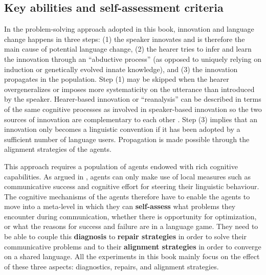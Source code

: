 \subsection{Key abilities and self-assessment criteria}

In the problem-solving approach adopted in this book, innovation and language change happens in three steps: (1) the speaker innovates and is therefore the main cause of potential language change, (2) the hearer tries to infer and learn the innovation through an ``abductive process'' (as opposed to uniquely relying on induction or genetically evolved innate knowledge), and (3) the innovation propagates in the population. Step (1) may be skipped when the hearer overgeneralizes or imposes more systematicity on the utterance than introduced by the speaker. Hearer-based innovation or ``reanalysis'' can be described in terms of the same cognitive processes as involved in speaker-based innovation so the two sources of innovation are complementary to each other \citep{hoefler08reanalysis}. Step (3) implies that an innovation only becomes a linguistic convention if it has been adopted by a sufficient number of language users. Propagation is made possible through the alignment strategies of the agents.

This approach requires a population of agents endowed with rich cognitive capabilities. As argued in , agents can only make use of local measures such as communicative success and cognitive effort for steering their linguistic behaviour. The cognitive mechanisms of the agents therefore have to enable the agents to move into a meta-level in which they can {\bfseries self-assess} what problems they encounter during communication, whether there is opportunity for optimization, or what the reasons for success and failure are in a language game. They need to be able to couple this {\bfseries diagnosis} to {\bfseries repair strategies} in order to solve their communicative problems and to their {\bfseries alignment strategies} in order to converge on a shared language. All the experiments in this book mainly focus on the effect of these three aspects: diagnostics, repairs, and alignment strategies.


